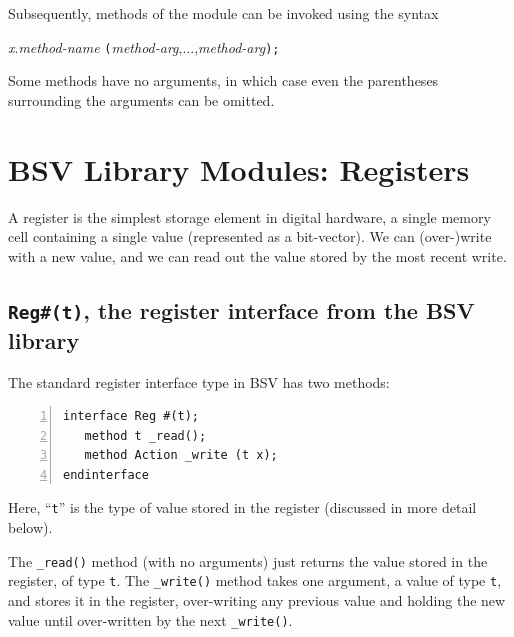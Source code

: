 Subsequently, methods of the module can be invoked using the syntax


\hmmmm \emph{x}.\emph{method-name} {\tt (}\emph{method-arg},...,\emph{method-arg}{\tt );}

Some methods have no arguments, in which case even the parentheses
surrounding the arguments can be omitted.


\section{BSV Library Modules: Registers}


A register is the simplest storage element in digital hardware, a
single memory cell containing a single value (represented as a
bit-vector).  We can (over-)write with a new value, and we can read
out the value stored by the most recent write.


\subsection{{\tt Reg\#(t)}, the register interface from the BSV library}

\label{Sec_Register_interface}


The standard register interface type in BSV has two methods:

{\small
\begin{Verbatim}[frame=single, numbers=left]
interface Reg #(t);
   method t _read();
   method Action _write (t x);
endinterface
\end{Verbatim}
}

Here, ``\verb|t|'' is the type of value stored in the register
(discussed in more detail below).

The \verb|_read()| method (with no arguments) just returns the value
stored in the register, of type \verb|t|.  The \verb|_write()| method
takes one argument, a value of type \verb|t|, and stores it in the
register, over-writing any previous value and holding the new value
until over-written by the next \verb|_write()|.

